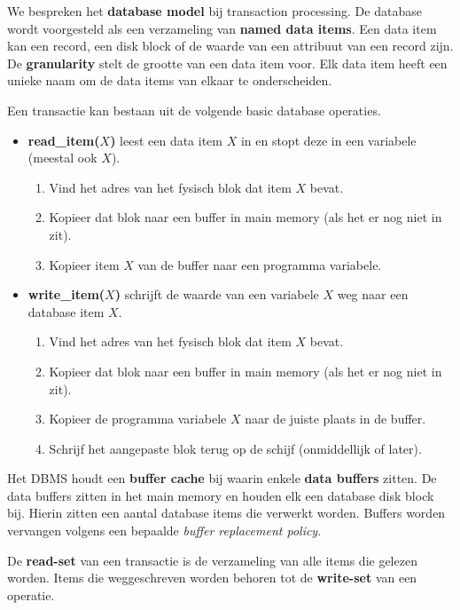 \noindent We bespreken het \textbf{database model} bij transaction processing. De database wordt voorgesteld als een verzameling van \textbf{named data items}. Een data item kan een record, een disk block of de waarde van een attribuut van een record zijn. De \textbf{granularity} stelt de grootte van een data item voor. Elk data item heeft een unieke naam om de data items van elkaar te onderscheiden.

Een transactie kan bestaan uit de volgende basic database operaties.
\begin{itemize}
	\item \textbf{read\_item($X$)} leest een data item $X$ in en stopt deze in een variabele (meestal ook $X$).
	\vspace{-2mm}
	\begin{enumerate}
		\item Vind het adres van het fysisch blok dat item $X$ bevat.
		\item Kopieer dat blok naar een buffer in main memory (als het er nog niet in zit).
		\item Kopieer item $X$ van de buffer naar een programma variabele.
	\end{enumerate}		

	\item \textbf{write\_item($X$)} schrijft de waarde van een variabele $X$ weg naar een database item $X$.
	\vspace{-2mm}
	\begin{enumerate}
		\item Vind het adres van het fysisch blok dat item $X$ bevat.
		\item Kopieer dat blok naar een buffer in main memory (als het er nog niet in zit).
		\item Kopieer de programma variabele $X$ naar de juiste plaats in de buffer.
		\item Schrijf het aangepaste blok terug op de schijf (onmiddellijk of later).
	\end{enumerate}
\end{itemize}
Het DBMS houdt een \textbf{buffer cache} bij waarin enkele \textbf{data buffers} zitten. De data buffers zitten in het main memory en houden elk een database disk block bij. Hierin zitten een aantal database items die verwerkt worden. Buffers worden vervangen volgens een bepaalde \textit{buffer replacement policy}.

De \textbf{read-set} van een transactie is de verzameling van alle items die gelezen worden. Items die weggeschreven worden behoren tot de \textbf{write-set} van een operatie.


